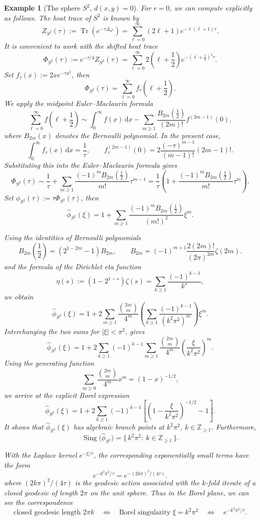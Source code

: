 \documentclass[11pt]{amsart}
\theoremstyle{plain}
\newtheorem{eg}[thm]{Example}
\theoremstyle{definition}
\newcommand{\Z}{\mathbb Z}
\newcommand{\dd}{\mathrm d}
\begin{document}
\begin{eg}[The sphere $S^2$, $d(x,y)=0$]\label{eg:r=0}
For $r=0$, we can compute explicitly as follows. The heat trace of $S^2$ is known by
\[
Z_{S^2}(\tau)
:=
\operatorname{Tr}(e^{-\tau\Delta_{S^2}})
=
\sum_{\ell=0}^{\infty}(2\ell+1)e^{-\ell(\ell+1)\tau}.
\]
It is convenient to work with the shifted heat trace
\[
\Phi_{S^2}(\tau)
:=e^{-\tau/4}Z_{S^2}(\tau)
=\sum_{\ell=0}^{\infty}
2\left(\ell+\frac12\right)e^{-(\ell+\frac12)^2\tau}.
\]
Set $f_\tau(x):=2x e^{-\tau x^2}$, then
\[
\Phi_{S^2}(\tau)=\sum_{\ell=0}^{\infty}
f_\tau\left(\ell+\frac12\right).
\]
We apply the midpoint Euler--Maclaurin formula
\[
\sum_{\ell=0}^{\infty} f\left(\ell+\frac12\right)
\sim
\int_0^\infty f(x)\,\dd x
-\sum_{m\geq 1}
\frac{B_{2m}(\frac12)}{(2m)!}
f^{(2m-1)}(0),
\]
where $B_{2m}(x)$ denotes the Bernoulli polynomial.  In the present case,
\[
\int_0^\infty f_\tau(x)\,\dd x=\frac1\tau,\qquad 
f_\tau^{(2m-1)}(0)
=2\frac{(-\tau)^{m-1}}{(m-1)!}(2m-1)!.
\]
Substituting this into the Euler--Maclaurin formula gives
\[
\Phi_{S^2}(\tau)
\sim\frac1\tau+\sum_{m\geq 1}
\frac{(-1)^m B_{2m}(\frac12)}{m!}\tau^{m-1}=\frac{1}{\tau}\left(1+\frac{(-1)^m B_{2m}(\frac12)}{m!}
\tau^{m}\right).
\]
Set $\phi_{S^2}(\tau):=\tau\Phi_{S^2}(\tau)$, then
\[
\widehat{\phi}_{S^2}(\xi)
=1+\sum_{m\geq 1}
\frac{(-1)^m B_{2m}(\frac12)}{(m!)^2}\xi^m.
\]

Using the identities of Bernoulli polynomials
\[
B_{2m}\left(\frac12\right)
=\left(2^{1-2m}-1\right)B_{2m},\qquad
B_{2m}
=(-1)^{m+1}
\frac{2(2m)!}{(2\pi)^{2m}}\zeta(2m).
\]
and the formula of the Dirichlet eta function
\[
\eta(s):=(1-2^{1-s})\zeta(s)
=\sum_{k\geq 1}\frac{(-1)^{k-1}}{k^s},
\]
we obtain
\[
\widehat{\phi}_{S^2}(\xi)=1+2\sum_{m\geq 1}
\frac{\binom{2m}{m}}{4^m}
\left(\sum_{k\geq 1}\frac{(-1)^{k-1}}{(k^2\pi^2)^m}\right)\xi^m.
\]
Interchanging the two sums for $|\xi|<\pi^2$,
gives
\[
\widehat{\phi}_{S^2}(\xi)
=1+2\sum_{k\geq 1}(-1)^{k-1}
\sum_{m\geq 1}\frac{\binom{2m}{m}}{4^m}\left(\frac{\xi}{k^2\pi^2}\right)^m.
\]
Using the generating function
\[
\sum_{m\geq 0}\frac{\binom{2m}{m}}{4^m}x^m
=(1-x)^{-1/2},
\]
we arrive at the explicit Borel expression
\[
\widehat{\phi}_{S^2}(\xi)=1+2\sum_{k\geq 1}(-1)^{k-1}\left[\left(1-\frac{\xi}{k^2\pi^2}\right)^{-1/2}
-1\right].
\]
It shows that $\widehat{\phi}_{S^2}(\xi)$ has algebraic branch points at $k^2\pi^2$, $k\in\Z_{\ge1}$. Furthermore, 
\[
\operatorname{Sing}\bigl(\widehat{\phi}_{S^2}\bigr)
=\{\,k^2\pi^2:\ k\in\Z_{\ge1}\,\}.
\]

With the Laplace kernel $e^{-\xi/\tau}$, the
corresponding exponentially small terms have the form
\[
e^{-k^2\pi^2/\tau}=e^{-(2k\pi)^2/(4\tau)}.
\]
where $(2k\pi)^2/(4\tau)$ is the geodesic action associated with the $k$-fold iterate of a
closed geodesic of length $2\pi$ on the unit sphere.  Thus in the Borel plane, we can see the correspondence
\[
\text{closed geodesic length }2\pi k
\quad\Longleftrightarrow\quad
\text{Borel singularity } \xi=k^2\pi^2
\quad\Longleftrightarrow\quad
e^{-k^2\pi^2/\tau}.
\]
\end{eg}
\end{document}
